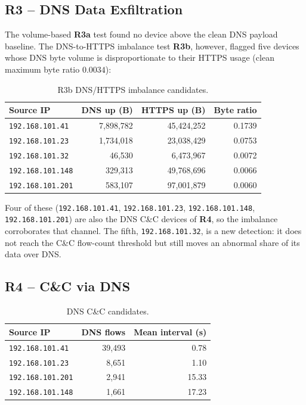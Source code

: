 \documentclass[11pt,a4paper]{article}
\newcommand{\ip}[1]{\texttt{#1}}
\newcommand{\ruleid}[1]{\textbf{#1}}
\begin{document}
\subsection{R3 -- DNS Data Exfiltration}

The volume-based \ruleid{R3a} test found no device above the clean DNS payload
baseline. The DNS-to-HTTPS imbalance test \ruleid{R3b}, however, flagged five
devices whose DNS byte volume is disproportionate to their HTTPS usage
(clean maximum byte ratio $0.0034$):

\begin{table}[H]
\centering
\caption{R3b DNS/HTTPS imbalance candidates.}
\begin{tabular}{lrrr}
\toprule
Source IP & DNS up (B) & HTTPS up (B) & Byte ratio \\
\midrule
\ip{192.168.101.41} & 7,898,782 & 45,424,252 & 0.1739 \\
\ip{192.168.101.23} & 1,734,018 & 23,038,429 & 0.0753 \\
\ip{192.168.101.32} & 46,530 & 6,473,967 & 0.0072 \\
\ip{192.168.101.148} & 329,313 & 49,768,696 & 0.0066 \\
\ip{192.168.101.201} & 583,107 & 97,001,879 & 0.0060 \\
\bottomrule
\end{tabular}
\end{table}

Four of these (\ip{192.168.101.41}, \ip{192.168.101.23}, \ip{192.168.101.148},
\ip{192.168.101.201}) are also the DNS C\&C devices of \ruleid{R4}, so the
imbalance corroborates that channel. The fifth, \ip{192.168.101.32}, is a new
detection: it does not reach the C\&C flow-count threshold but still moves an
abnormal share of its data over DNS.

\subsection{R4 -- C\&C via DNS}

\begin{table}[H]
\centering
\caption{DNS C\&C candidates.}
\begin{tabular}{lrr}
\toprule
Source IP & DNS flows & Mean interval (s) \\
\midrule
\ip{192.168.101.41} & 39,493 & 0.78 \\
\ip{192.168.101.23} & 8,651 & 1.10 \\
\ip{192.168.101.201} & 2,941 & 15.33 \\
\ip{192.168.101.148} & 1,661 & 17.23 \\
\bottomrule
\end{tabular}
\end{table}
\end{document}
